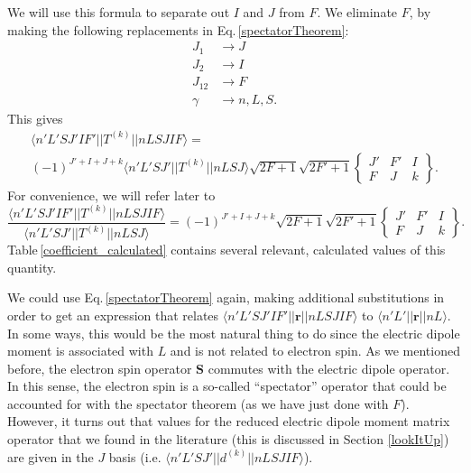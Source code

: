 We will use this formula to separate out $I$ and $J$ from $F$.
We eliminate $F$, by making the following replacements in Eq.\,\ref{spectatorTheorem}:
\begin{align}
J_1&\rightarrow J\\
J_2&\rightarrow I\\
J_{12}&\rightarrow F\\
\gamma &\rightarrow  n,L,S.
\end{align}
This gives 
\begin{multline}\label{spectatorTheorem1}
\langle n' L' S J' I F'||T^{(k)}||n L S J I F\rangle=
\\(-1)^{J'+I+J+k}\langle n'L' S J'||T^{(k)}|| n L S J\rangle
\sqrt{2F+1}\sqrt{2F'+1}
\begin{Bmatrix}
J' & F' & I \\
F & J & k
\end{Bmatrix}.
\end{multline}
For convenience, we will refer later to 
\begin{equation}
\frac{\langle n' L' S J' I F'||T^{(k)}||n L S J I F\rangle}{\langle n'L' S J'||T^{(k)}|| n L S J\rangle}=(-1)^{J'+I+J+k}\sqrt{2F+1}\sqrt{2F'+1}
\begin{Bmatrix}
J' & F' & I \\
F & J & k
\end{Bmatrix}.
\label{afterSpectators}
\end{equation} 
Table\,\ref{coefficient_calculated} contains several relevant, calculated values of this quantity.

We could use Eq.\,\ref{spectatorTheorem} again, making additional substitutions in order to get an expression that relates $\langle n' L' S J' I F' ||\mathbf{r}||n L S J I F\rangle$ to $\langle n' L'||\mathbf{r}||n L \rangle$. In some ways, this would be the most natural thing to do since the electric dipole moment is associated with $L$ and is not related to electron spin. As we mentioned before, the electron spin operator $\mathbf{S}$ commutes with the electric dipole operator. In this sense, the electron spin is a so-called ``spectator'' operator that could be accounted for with the spectator theorem (as we have just done with $F$). However, it turns out that values for the reduced electric dipole moment matrix operator that we found in the literature (this is discussed in Section \ref{lookItUp}) are given in the $J$ basis (i.e. $\langle n'L'S J'||d^{(k)}||n L S J I F\rangle$).

